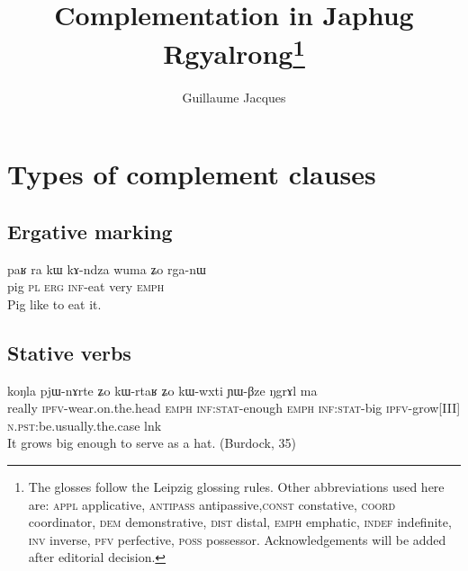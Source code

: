 \documentclass[oldfontcommands,oneside,a4paper,11pt]{article}
\newcommand{\ipa}[1]{{\phon #1}} %
\begin{document}
 

\title{Complementation in Japhug Rgyalrong\footnote{
The glosses follow the Leipzig glossing rules. Other abbreviations used here are: \textsc{appl} applicative, \textsc{antipass} antipassive,\textsc{const} constative, \textsc{coord} coordinator, \textsc{dem} demonstrative, \textsc{dist} distal, \textsc{emph} emphatic, \textsc{indef} indefinite, \textsc{inv} inverse,  \textsc{pfv} perfective, \textsc{poss} possessor. %
Acknowledgements will be added after editorial decision.  
} }
\author{Guillaume Jacques}
\maketitle
\linenumbers
 
 \citet[9]{dixon06complementation}
 \citet{sun12complementation}
 \citet{jacques08}
 
\section{Types of complement clauses} 


\subsection{Ergative marking}

 \begin{exe}
\ex \label{ex:erg.rga}
\gll
\ipa{paʁ}  	\ipa{ra}  	\ipa{kɯ}  	\ipa{kɤ-ndza}  	\ipa{wuma}  	\ipa{ʑo}  	\ipa{rga-nɯ}  \\
pig \textsc{pl} \textsc{erg} \textsc{inf}-eat very \textsc{emph} \\
 \glt Pig like to eat it.
\end{exe}

 \subsection{Stative verbs}
 
 \begin{exe}
\ex \label{ex:pjWnArte}
\gll
 \ipa{koŋla} 	\ipa{pjɯ-nɤrte} 	\ipa{ʑo} 	\ipa{kɯ-rtaʁ} 	\ipa{ʑo} 	\ipa{kɯ-wxti} 	\ipa{ɲɯ-βze} 	\ipa{ŋgrɤl} 	\ipa{ma} \\
 really \textsc{ipfv}-wear.on.the.head \textsc{emph} \textsc{inf:stat}-enough \textsc{emph}  \textsc{inf:stat}-big \textsc{ipfv}-grow[III] \textsc{n.pst}:be.usually.the.case lnk \\
 \glt It grows big enough to serve as a hat. (Burdock, 35)

\end{exe}
\end{document}
